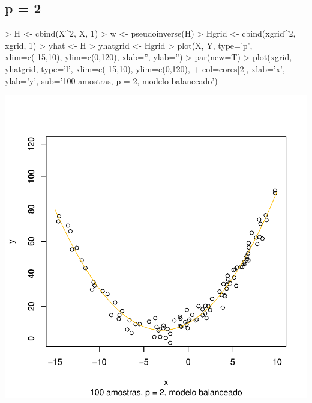 \documentclass{article}
\begin{document}
\subsection{p = 2}
\begin{Schunk}
\begin{Sinput}
> H <- cbind(X^2, X, 1)
> w <- pseudoinverse(H) %
> Hgrid <- cbind(xgrid^2, xgrid, 1)
> yhat <- H %
> yhatgrid <- Hgrid %
> plot(X, Y, type='p', xlim=c(-15,10), ylim=c(0,120), xlab='', ylab='')
> par(new=T)
> plot(xgrid, yhatgrid, type='l', xlim=c(-15,10), ylim=c(0,120),
+      col=cores[2], xlab='x', ylab='y', sub='100 amostras, p = 2, modelo balanceado')
\end{Sinput}
\end{Schunk}
\includegraphics{aprox-012}
\end{document}
